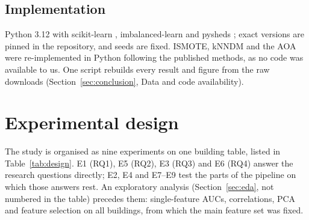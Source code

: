 \documentclass[journal,a4paper]{IEEEtran}
\begin{document}
\subsection{Implementation}
Python 3.12 with scikit-learn \citep{pedregosa2011}, imbalanced-learn \citep{lemaitre2017} and pysheds \citep{pysheds}; exact versions are pinned in the repository, and seeds are fixed. ISMOTE, kNNDM and the AOA were re-implemented in Python following the published methods, as no code was available to us. One script rebuilds every result and figure from the raw downloads (Section~\ref{sec:conclusion}, Data and code availability).

\section{Experimental design}\label{sec:design}
The study is organised as nine experiments on one building table, listed in Table~\ref{tab:design}. E1 (RQ1), E5 (RQ2), E3 (RQ3) and E6 (RQ4) answer the research questions directly; E2, E4 and E7--E9 test the parts of the pipeline on which those answers rest. An exploratory analysis (Section~\ref{sec:eda}, not numbered in the table) precedes them: single-feature AUCs, correlations, PCA and feature selection on all buildings, from which the main feature set was fixed.
\end{document}
